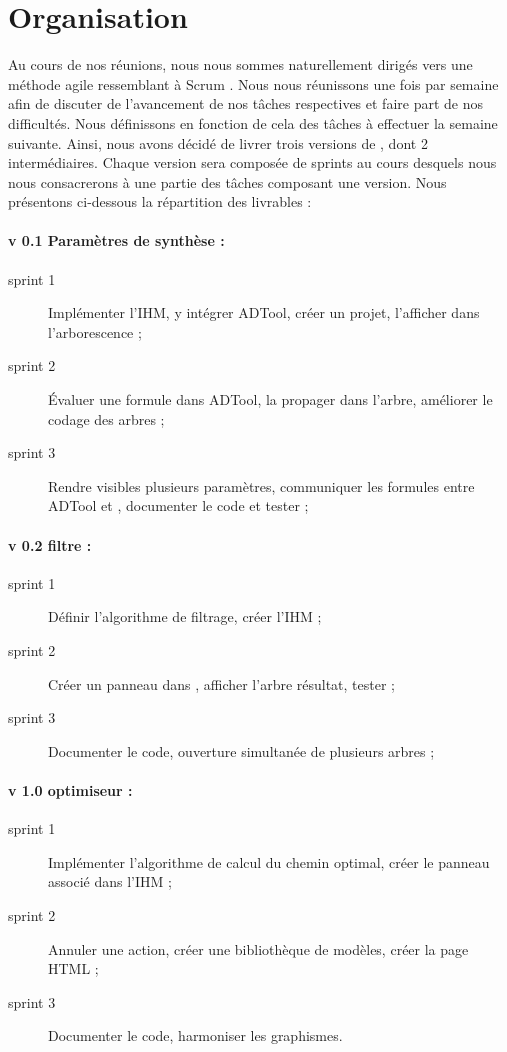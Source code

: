 \section{Organisation}
	\label{sec:livrables}

	Au cours de nos réunions, nous nous sommes naturellement dirigés vers une méthode agile ressemblant à \og Scrum \fg. Nous nous réunissons une fois par semaine afin de discuter de l'avancement de nos tâches respectives et faire part de nos difficultés. Nous définissons en fonction de cela des tâches à effectuer la semaine suivante. Ainsi, nous avons décidé de livrer trois versions de \glasir{}, dont 2 intermédiaires.
	Chaque version sera composée de sprints au cours desquels nous nous consacrerons à une partie des tâches composant une version.
	Nous présentons ci-dessous la répartition des livrables :
	
	\paragraph{v 0.1 Paramètres de synthèse :}
		\begin{description}
			\item[sprint 1] Implémenter l'IHM, y intégrer ADTool, créer un projet, l'afficher dans l'arborescence ;
			\item[sprint 2] Évaluer une formule dans ADTool, la propager dans l'arbre, améliorer le codage des arbres ;
			\item[sprint 3] Rendre visibles plusieurs paramètres, communiquer les formules entre ADTool et \glasir{}, documenter le code et tester ;
		\end{description}
	\paragraph{v 0.2 filtre :} 
		\begin{description}
			\item[sprint 1] Définir l'algorithme de filtrage, créer l'IHM ;
			\item[sprint 2] Créer un panneau dans \glasir{}, afficher l'arbre résultat, tester ;
			\item[sprint 3] Documenter le code, ouverture simultanée de plusieurs arbres ;
		\end{description}
	\paragraph{v 1.0 optimiseur : }
		\begin{description}
			\item[sprint 1] Implémenter l'algorithme de calcul du chemin optimal, créer le panneau associé dans l'IHM ;
			\item[sprint 2] Annuler une action, créer une bibliothèque de modèles, créer la page HTML ;
			\item[sprint 3] Documenter le code, harmoniser les graphismes.
		\end{description}
	


